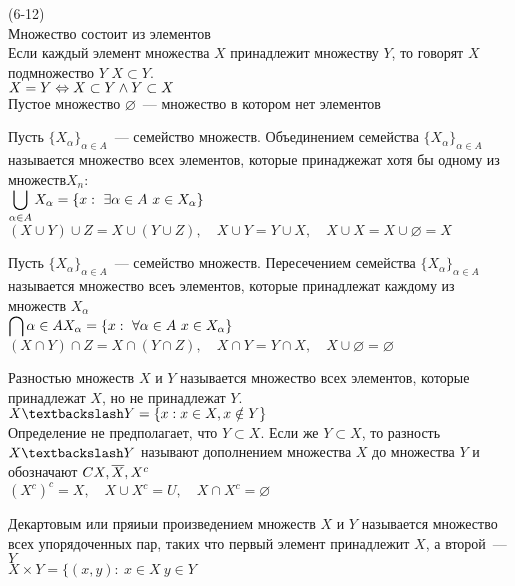 (6-12)\\
Множество состоит из элементов\\
Если каждый элемент множества $X$ принадлежит множеству $Y$, то говорят $X$ подмножество $Y$  $X \subset Y$.\\
$X = Y \Leftrightarrow X \subset Y \wedge Y \subset X$\\
Пустое множество $\varnothing$~--- множество в котором нет элементов

Пусть $\{X_\alpha\}_{\alpha \in A}$~--- семейство множеств. Объединением семейства $\{X_\alpha\}_{\alpha \in A}$ называется множество всех элементов, которые принаджежат хотя бы одному из множеств$X_n$:\\
$\displaystyle\bigcup\limits_{\alpha \in A} X_\alpha = \{x:\ \exists\alpha \in A\ x \in X_\alpha\}$\\
$(X\cup Y) \cup Z = X \cup (Y\cup Z),\quad X\cup Y = Y \cup X,\quad X \cup X = X\cup \varnothing = X$

Пусть $\{X_\alpha\}_{\alpha \in A}$~--- семейство множеств. Пересечением семейства $\{X_\alpha\}_{\alpha \in A}$ называется множество всеъ элементов, которые принадлежат каждому из множеств $X_\alpha$\\
$\displaystyle\bigcap\limits{\alpha \in A} X_\alpha = \{x:\ \forall \alpha \in A\ x \in X_\alpha\}$\\
$(X\cap Y) \cap Z = X \cap (Y\cap Z),\quad X\cap Y = Y \cap X,\quad X\cup \varnothing = \varnothing$

Разностью множеств $X$ и $Y$ называется множество всех элементов, которые принадлежат $X$, но не принадлежат $Y$.\\
$X \bsl Y = \{x: x\in X, x \notin Y\}$\\
Определение не предполагает, что $Y \subset X$. Если же $Y \subset X$, то разность $X\bsl Y$ называют дополнением множества $X$ до множества $Y$ и обозначают $CX, \overline{X}, X^c$\\
$(X^c)^c = X,\quad X \cup X^c = U,\quad X \cap X^c = \varnothing$

Декартовым или пряиыи произведением множеств $X$ и $Y$ называется множество всех упорядоченных пар, таких что первый элемент принадлежит $X$, а второй~--- $Y$\\
$X \times Y = \{(x, y):\ x\in X\ y \in Y$